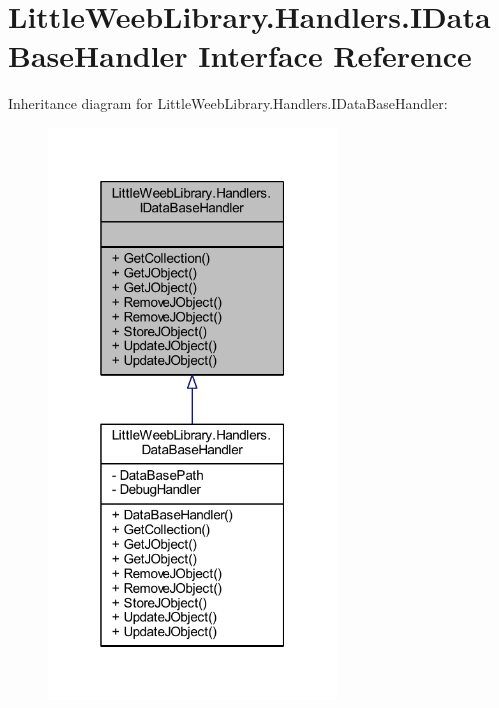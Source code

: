 \hypertarget{interface_little_weeb_library_1_1_handlers_1_1_i_data_base_handler}{}\section{Little\+Weeb\+Library.\+Handlers.\+I\+Data\+Base\+Handler Interface Reference}
\label{interface_little_weeb_library_1_1_handlers_1_1_i_data_base_handler}


Inheritance diagram for Little\+Weeb\+Library.\+Handlers.\+I\+Data\+Base\+Handler\+:\nopagebreak
\begin{figure}[H]
\begin{center}
\leavevmode
\includegraphics[width=217pt]{interface_little_weeb_library_1_1_handlers_1_1_i_data_base_handler__inherit__graph}
\end{center}
\end{figure}


